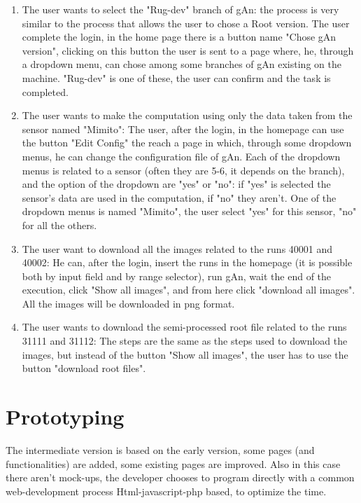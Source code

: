 \begin{enumerate}
\item The user wants to select the "Rug-dev" branch of gAn:
the process is very similar to the process that allows the user to chose a Root version. The user complete the login, in the home page there is a button name "Chose gAn version", clicking on this button the user is sent to a page where, he, through a dropdown menu, can chose among some branches of gAn existing on the machine. "Rug-dev" is one of these, the user can confirm and the task is completed.

\item The user wants to make the computation using only the data taken from the sensor named "Mimito":
The user, after the login, in the homepage can use the button "Edit Config" the reach a page in which, through some dropdown menus, he can change the configuration file of gAn. Each of the dropdown menus is related to a sensor (often they are 5-6, it depends on the branch), and the option of the dropdown are "yes" or "no": if "yes" is selected the sensor's data are used in the computation, if "no" they aren't. One of the dropdown menus is named "Mimito", the user select "yes" for this sensor, "no" for all the others.  

\item The user want to download all the images related to the runs 40001 and 40002:
He can, after the login, insert the runs in the homepage (it is possible both by input field and by range selector), run gAn, wait the end of the execution, click "Show all images", and from here click "download all images". All the images will be downloaded in png format.

\item The user wants to download the semi-processed root file related to the runs 31111 and 31112:
The steps are the same as the steps used to download the images, but instead of the button "Show all images", the user has to use the button "download root files".     

\end{enumerate}  


\section{Prototyping}

The intermediate version is based on the early version, some pages (and functionalities) are added, some existing pages are improved. 
Also in this case there aren't mock-ups, the developer chooses to program directly with a common web-development process Html-javascript-php based, to optimize the time.

